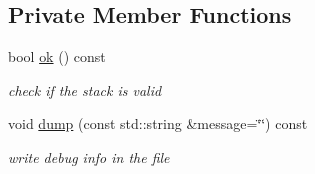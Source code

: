 \subsection*{Private Member Functions}
\begin{DoxyCompactItemize}
\item 
bool \hyperlink{class_my_namespace_1_1_stack_a5782682e948051947d47a25b69f7918a}{ok} () const
\begin{DoxyCompactList}\small\item\em check if the stack is valid \end{DoxyCompactList}\item 
void \hyperlink{class_my_namespace_1_1_stack_a83672fc8b95f37236f3c40354abb6b79}{dump} (const std\+::string \&message=\char`\"{}\char`\"{}) const
\begin{DoxyCompactList}\small\item\em write debug info in the file \end{DoxyCompactList}\end{DoxyCompactItemize}
